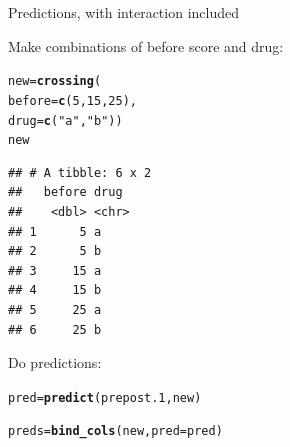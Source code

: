 \documentclass[unknownkeysallowed]{beamer}\usepackage[]{graphicx}\usepackage[]{color}
\makeatletter
\newcommand{\hlnum}[1]{\textcolor[rgb]{0.686,0.059,0.569}{#1}}%
\newcommand{\hlstr}[1]{\textcolor[rgb]{0.192,0.494,0.8}{#1}}%
\newcommand{\hlstd}[1]{\textcolor[rgb]{0.345,0.345,0.345}{#1}}%
\newcommand{\hlkwb}[1]{\textcolor[rgb]{0.69,0.353,0.396}{#1}}%
\newcommand{\hlkwc}[1]{\textcolor[rgb]{0.333,0.667,0.333}{#1}}%
\newcommand{\hlkwd}[1]{\textcolor[rgb]{0.737,0.353,0.396}{\textbf{#1}}}%
\newenvironment{kframe}{%
 \def\at@end@of@kframe{}%
 \ifinner\ifhmode%
  \def\at@end@of@kframe{\end{minipage}}%
  \begin{minipage}{\columnwidth}%
 \fi\fi%
 \def\FrameCommand##1{\hskip\@totalleftmargin \hskip-\fboxsep
 \colorbox{shadecolor}{##1}\hskip-\fboxsep
     \hskip-\linewidth \hskip-\@totalleftmargin \hskip\columnwidth}%
 \MakeFramed {\advance\hsize-\width
   \@totalleftmargin\z@ \linewidth\hsize
   \@setminipage}}%
 {\par\unskip\endMakeFramed%
 \at@end@of@kframe}
\newenvironment{knitrout}{}{} %
\makeatother
\begin{document}
\begin{frame}[fragile]{Predictions, with interaction included}


  
  \begin{multicols}{2}
    

  
  Make combinations of before score and drug:
  
\begin{knitrout}
\color{fgcolor}\begin{kframe}
\begin{alltt}
\hlstd{new}\hlkwb{=}\hlkwd{crossing}\hlstd{(}
      \hlkwc{before}\hlstd{=}\hlkwd{c}\hlstd{(}\hlnum{5}\hlstd{,}\hlnum{15}\hlstd{,}\hlnum{25}\hlstd{),}
      \hlkwc{drug}\hlstd{=}\hlkwd{c}\hlstd{(}\hlstr{"a"}\hlstd{,}\hlstr{"b"}\hlstd{))}
\hlstd{new}
\end{alltt}
\begin{verbatim}
## # A tibble: 6 x 2
##   before drug 
##    <dbl> <chr>
## 1      5 a    
## 2      5 b    
## 3     15 a    
## 4     15 b    
## 5     25 a    
## 6     25 b
\end{verbatim}
\end{kframe}
\end{knitrout}

Do predictions:

\begin{knitrout}\small
{}\color{fgcolor}\begin{kframe}
\begin{alltt}
\hlstd{pred}\hlkwb{=}\hlkwd{predict}\hlstd{(prepost.1,new)}
\end{alltt}


{\ttfamily\noindent\bfseries\color{errorcolor}{\#\# Error in predict(prepost.1, new): object 'prepost.1' not found}}\begin{alltt}
\hlstd{preds}\hlkwb{=}\hlkwd{bind_cols}\hlstd{(new,}\hlkwc{pred}\hlstd{=pred)}
\end{alltt}



\end{kframe}
\end{knitrout}
\end{multicols}
\end{frame}
\end{document}
